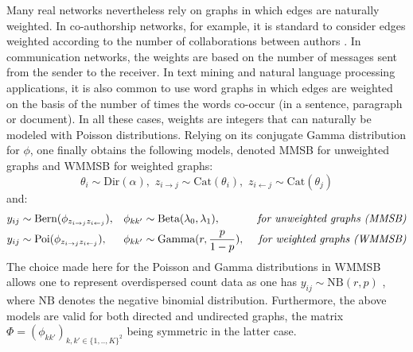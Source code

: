 Many real networks nevertheless rely on graphs in which edges are naturally weighted. In co-authorship networks, for example, it is standard to consider edges weighted according to the number of collaborations between authors \cite{newman2001scientific}. In communication networks, the weights are based on the number of messages sent from the sender to the receiver. In text mining and natural language processing applications, it is also common to use word graphs in which edges are weighted on the basis of the number of times the words co-occur (in a sentence, paragraph or document). In all these cases, weights are integers that can naturally be modeled with Poisson distributions. Relying on its conjugate Gamma distribution for $\phi$, one finally obtains the following models, denoted MMSB for unweighted graphs and WMMSB for weighted graphs:
%
\[
\theta_i \sim \textrm{Dir}(\alpha), \,\, z_{i\rightarrow j} \sim \textrm{Cat}(\theta_i), \,\, z_{i\leftarrow j} \sim \textrm{Cat}(\theta_j)
\]
%
and:
%
\begin{align*} \label{eq:generative}
y_{ij} &\sim \textrm{Bern}(\phi_{z_{i \rightarrow j}z_{i \leftarrow j}}), &\phi_{kk'} &\sim \textrm{Beta}(\lambda_0, \lambda_1), & \textrm{  \textit{for unweighted graphs (MMSB)}} \\
y_{ij} &\sim \textrm{Poi}(\phi_{z_{i \rightarrow j}z_{i \leftarrow j}}), &\phi_{kk'} &\sim \textrm{Gamma}(r, \frac{p}{1-p}),    & \textrm{  \textit{for weighted graphs (WMMSB)}} 
\end{align*}
%
The choice made here for the Poisson and Gamma distributions in WMMSB allows one to represent overdispersed count data as one has $y_{ij} \sim \textrm{NB}(r,p)$ \cite{zhou2012beta}, where $\textrm{NB}$ denotes the negative binomial distribution. Furthermore, the above models are valid for both directed and undirected graphs, the matrix $\Phi = (\phi_{kk'})_{k,k' \in \{1,..,K\}^2}$ being symmetric in the latter case.


